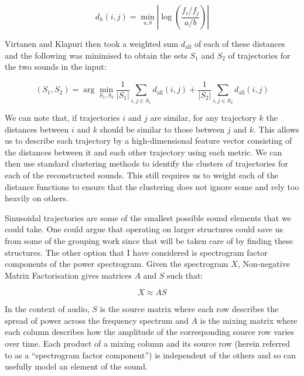 \documentclass[12pt,a4paper,twoside,openright]{report}
\begin{document}
\begin{equation}
d_h(i,j) = \min_{a, b} \left| \log \left( \frac{f_i/f_j}{a/b} \right) \right|
\label{sinDh}
\end{equation}

Virtanen and Klapuri then took a weighted sum $ d_{\mathrm{all}} $ of each of these distances and the following was minimised to obtain the sets $ S_1 $ and $ S_2 $ of trajectories for the two sounds in the input:

\begin{equation}
(S_1, S_2) = \arg\min_{S_1, S_2} \frac{1}{|S_1|} \sum_{i, j \in S_1} d_{\mathrm{all}}(i,j) + \frac{1}{|S_2|} \sum_{i, j \in S_2} d_{\mathrm{all}}(i,j)
\end{equation}


We can note that, if trajectories $ i $ and $ j $ are similar, for any trajectory $ k $ the distances between $ i $ and $ k $ should be similar to those between $ j $ and $ k $. This allows us to describe each trajectory by a high-dimensional feature vector consisting of the distances between it and each other trajectory using each metric. We can then use standard clustering methods to identify the clusters of trajectories for each of the reconstructed sounds. This still requires us to weight each of the distance functions to ensure that the clustering does not ignore some and rely too heavily on others.

Sinusoidal trajectories are some of the smallest possible sound elements that we could take. One could argue that operating on larger structures could save us from some of the grouping work since that will be taken care of by finding these structures. The other option that I have considered is spectrogram factor components of the power spectrogram. Given the spectrogram $ X $, Non-negative Matrix Factorisation gives matrices $ A $ and $ S $ such that:

\begin{equation}
X \approx AS
\end{equation}

In the context of audio, $ S $ is the source matrix where each row describes the spread of power across the frequency spectrum and $ A $ is the mixing matrix where each column describes how the amplitude of the corresponding source row varies over time. Each product of a mixing column and its source row (herein referred to as a ``spectrogram factor component'') is independent of the others and so can usefully model an element of the sound.
\end{document}
